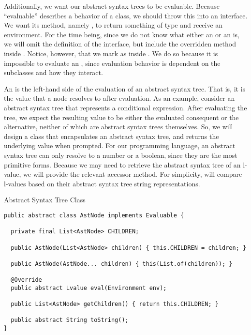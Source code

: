 Additionally, we want our abstract syntax trees to be evaluable. Because ``evaluable'' describes a behavior of a class, we should throw this into an interface. We want its method, namely , to return something of type  and receive an environment. For the time being, since we do not know what either an  or an  is, we will omit the definition of the interface, but include the overridden method inside . Notice, however, that we mark  as  inside . We do so because it is impossible to evaluate an , since evaluation behavior is dependent on the subclasses and how they interact.

An  is the left-hand side of the evaluation of an abstract syntax tree. That is, it is the value that a node resolves to after evaluation. As an example, consider an abstract syntax tree that represents a conditional expression. After evaluating the tree, we expect the resulting value to be either the evaluated consequent or the alternative, neither of which are abstract syntax trees themselves. So, we will design a class that encapsulates an abstract syntax tree, and returns the underlying value when prompted. For our programming language, an abstract syntax tree can only resolve to a number or a boolean, since they are the most primitive forms. Because we may need to retrieve the abstract syntax tree of an l-value, we will provide the relevant accessor method. For simplicity, will compare l-values based on their abstract syntax tree string representations.

\begin{cl}{Abstract Syntax Tree Class}
\begin{lstlisting}[language=MyJava]
public abstract class AstNode implements Evaluable {

  private final List<AstNode> CHILDREN;  
 
  public AstNode(List<AstNode> children) { this.CHILDREN = children; }

  public AstNode(AstNode... children) { this(List.of(children)); }

  @Override
  public abstract Lvalue eval(Environment env);

  public List<AstNode> getChildren() { return this.CHILDREN; }

  public abstract String toString();
}
\end{lstlisting}
\end{cl}

